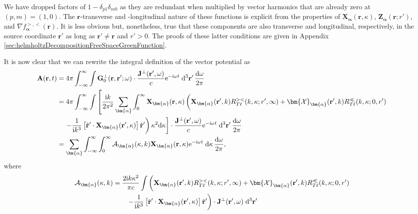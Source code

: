 We have dropped factors of $1 - \delta_{p1}\delta_{m0}$ as they are redundant when multiplied by vector harmonics that are already zero at $(p,m) = (1,0)$. The $\mathbf{r}$-transverse and -longitudinal nature of these functions is explicit from the properties of $\mathbf{X}_{\bm{\alpha}}(\mathbf{r},\kappa)$, $\mathbf{Z}_{\bm{\alpha}}(\mathbf{r};r')$, and $\nabla f_{\bm{\alpha}}^{>,<}(\mathbf{r})$. It is less obvious but, nonetheless, true that these components are also transverse and longitudinal, respectively, in the source coordinate $\mathbf{r}'$ as long as $\mathbf{r}'\neq\mathbf{r}$ and $r' > 0$. The proofs of these latter conditions are given in Appendix \ref{sec:helmholtzDecompositionFreeSpaceGreenFunction}.

It is now clear that we can rewrite the integral definition of the vector potential as
\begin{equation}
\begin{split}
\mathbf{A}(\mathbf{r},t) &= 4\pi\int_{-\infty}^{\infty}\int\mathbf{G}_0^\perp(\mathbf{r},\mathbf{r}';\omega)\cdot\frac{\mathbf{J}^\perp(\mathbf{r}',\omega)}{c}\mathrm{e}^{-\mathrm{i}\omega t}\;\mathrm{d}^3\mathbf{r}'\,\frac{\mathrm{d}\omega}{2\pi}\\
&= 4\pi\int_{-\infty}^\infty\int\left[\frac{\mathrm{i}k}{2\pi^2}\sum_{\bm{\alpha}}\int_0^\infty\mathbf{X}_{\bm{\alpha}}(\mathbf{r},\kappa)\left( \vphantom{\frac{1}{4\pi k^2}} \mathbf{X}_{\bm{\alpha}}(\mathbf{r}',k)R_{T\ell}^{><}(k,\kappa;r',\infty) + \bm{\mathcal{X}}_{\bm{\alpha}}(\mathbf{r}',k)R_{T\ell}^\ll(k,\kappa;0,r')\right.\right.\\
&\quad\left.\left.- \frac{1}{\mathrm{i} k^3}\left[\hat{\mathbf{r}}'\cdot\mathbf{X}_{\bm{\alpha}}(\mathbf{r}',\kappa)\right]\hat{\mathbf{r}}'\right)\kappa^2\mathrm{d}\kappa \vphantom{\int_0^\infty} \right]\cdot\frac{\mathbf{J}^\perp(\mathbf{r}',\omega)}{c}\mathrm{e}^{-\mathrm{i}\omega t}\;\mathrm{d}^3\mathbf{r}'\,\frac{\mathrm{d}\omega}{2\pi}\\
&= \sum_{\bm{\alpha}}\int_{-\infty}^\infty\int_0^\infty\mathcal{A}_{\bm{\alpha}}(\kappa,k)\mathbf{X}_{\bm{\alpha}}(\mathbf{r},\kappa)\mathrm{e}^{-\mathrm{i}\omega t}\;\mathrm{d}\kappa\,\frac{\mathrm{d}\omega}{2\pi},
\end{split}
\end{equation}
where
\begin{equation}\label{eq:AconnectionFunction}
\begin{split}
\mathcal{A}_{\bm{\alpha}}(\kappa,k) &= \frac{2\mathrm{i}k\kappa^2}{\pi c}\int\left( \vphantom{\frac{1}{k^3}} \mathbf{X}_{\bm{\alpha}}(\mathbf{r}',k)R_{T\ell}^{><}(k,\kappa;r',\infty) + \bm{\mathcal{X}}_{\bm{\alpha}}(\mathbf{r}',k)R^\ll_{T\ell}(k,\kappa;0,r')\right.\\
&\qquad\left.- \frac{1}{\mathrm{i}k^3}\left[\hat{\mathbf{r}}'\cdot\mathbf{X}_{\bm{\alpha}}(\mathbf{r}',\kappa)\right]\hat{\mathbf{r}}'\right)\cdot\mathbf{J}^\perp(\mathbf{r}',\omega)\;\mathrm{d}^3\mathbf{r}'
\end{split}
\end{equation}
